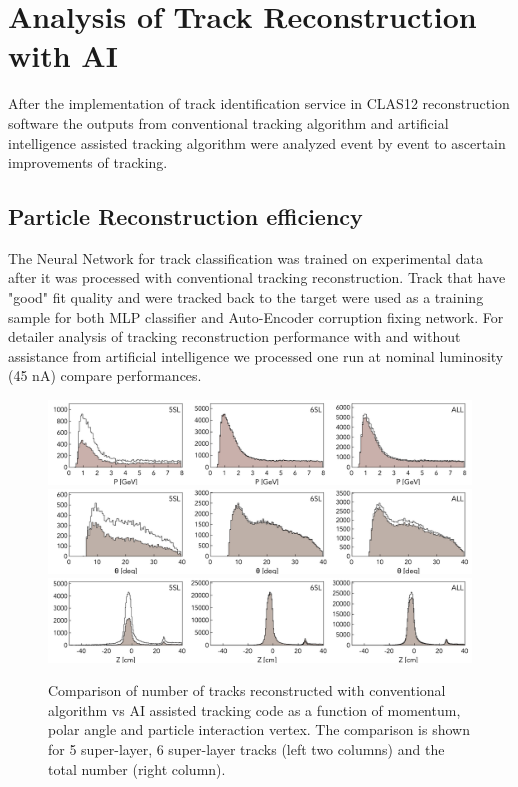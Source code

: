 \section{Analysis of Track Reconstruction with AI}

After the implementation of track identification service in CLAS12 reconstruction software the outputs
from conventional tracking algorithm and artificial intelligence assisted tracking algorithm were analyzed
event by event to ascertain improvements of tracking. 
 
 \subsection{Particle Reconstruction efficiency}
 
 The Neural Network for track classification was trained on experimental data after it was processed with conventional tracking 
 reconstruction. Track that have "good" fit quality and were tracked back to the target were used as a training sample for both 
 MLP classifier and Auto-Encoder corruption fixing network. For detailer analysis of tracking reconstruction performance with and without 
 assistance from artificial intelligence we processed one run at nominal luminosity (45 nA) compare performances.
 
 \begin{figure}[!ht]
\begin{center}
  \includegraphics[width=6.5in]{images/figure_p.pdf}
  \includegraphics[width=6.5in]{images/figure_theta.pdf}
    \includegraphics[width=6.5in]{images/figure_vz.pdf}
\caption { Comparison of number of tracks reconstructed with conventional algorithm vs AI assisted tracking code as a function of momentum, polar angle and particle interaction vertex. The comparison is shown for 5 super-layer, 6 super-layer tracks (left two columns) and the total number (right column).}
 \label{track:efficiency}
 \end{center}
\end{figure}


